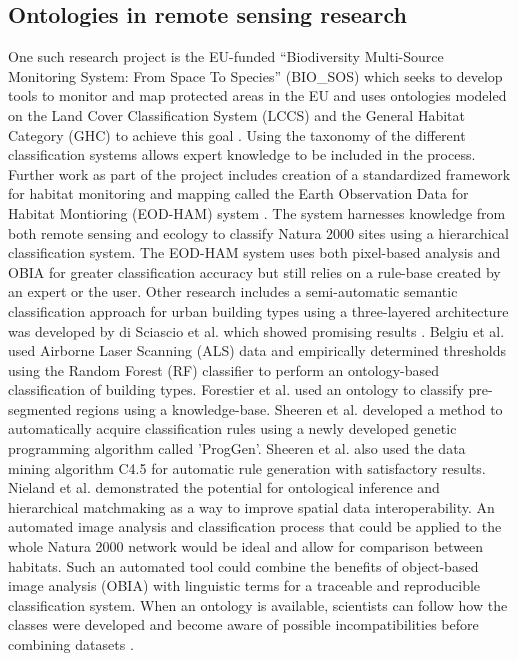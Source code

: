 \documentclass[a4paper,12pt]{article}
\begin{document}
\subsection{Ontologies in remote sensing research}
One such research project is the EU-funded ``Biodiversity Multi-Source
Monitoring System:
From Space To Species'' (BIO\_SOS) which seeks to develop tools to monitor and
map protected areas in the EU and uses ontologies modeled on the Land Cover
Classification System (LCCS) and the General Habitat Category (GHC) to achieve
this goal \cite{Arvor2013}. Using the taxonomy of the different classification
systems allows expert knowledge to be included in the process.
Further work as part of the project includes creation of a standardized
framework for habitat monitoring and mapping called the Earth Observation Data
for Habitat Montioring (EOD-HAM) system \cite{Lucas2015}. The system harnesses
knowledge from both remote sensing and ecology to classify Natura 2000 sites
using a hierarchical classification system. The EOD-HAM system uses both
pixel-based analysis and OBIA for greater classification accuracy but still
relies on a rule-base created by an expert or the user. Other research includes
a semi-automatic semantic classification approach for urban building types using
a three-layered architecture was developed by di Sciascio et al. which showed
promising results \cite{diSciascio2013}. Belgiu et al. \cite{Belgiu2014} used
Airborne Laser Scanning (ALS) data and empirically determined thresholds using
the Random Forest (RF) classifier to perform an ontology-based classification of
building types. Forestier et al. \cite{Forestier2012470} used an ontology to
classify pre-segmented regions using a knowledge-base. Sheeren et al.
\cite{Sheeren2006ML} developed a method to automatically acquire classification
rules using a newly developed genetic programming algorithm called 'ProgGen'.
Sheeren et al. also used the data mining algorithm C4.5 for automatic rule
generation with satisfactory results. Nieland et al. \cite{Nieland2015}
demonstrated the potential for ontological inference and hierarchical
matchmaking as a way to improve spatial data interoperability. An automated
image analysis and classification process that could be applied to the whole
Natura 2000 network would be ideal and allow for comparison between habitats.
Such an automated tool could combine the benefits of object-based image analysis
(OBIA) with linguistic terms for a traceable and reproducible classification
system. When an ontology is available, scientists can follow how the classes
were developed and become aware of possible incompatibilities before combining
datasets \cite{Janowicz2012}.
\end{document}
